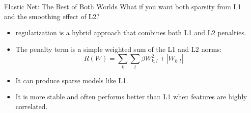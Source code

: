 \begin{frame}{Elastic Net: The Best of Both Worlds}
    What if you want both sparsity from L1 and the smoothing effect of L2?
    \begin{itemize}
        \item {} regularization is a hybrid approach that combines both L1 and L2 penalties.
        \item The penalty term is a simple weighted sum of the L1 and L2 norms:
            $$ R(W) = \sum_k \sum_l \beta W_{k,l}^2 + |W_{k,l}| $$
        \item It can produce sparse models like L1.
        \item It is more stable and often performs better than L1 when features are highly correlated.
    \end{itemize}
\end{frame}